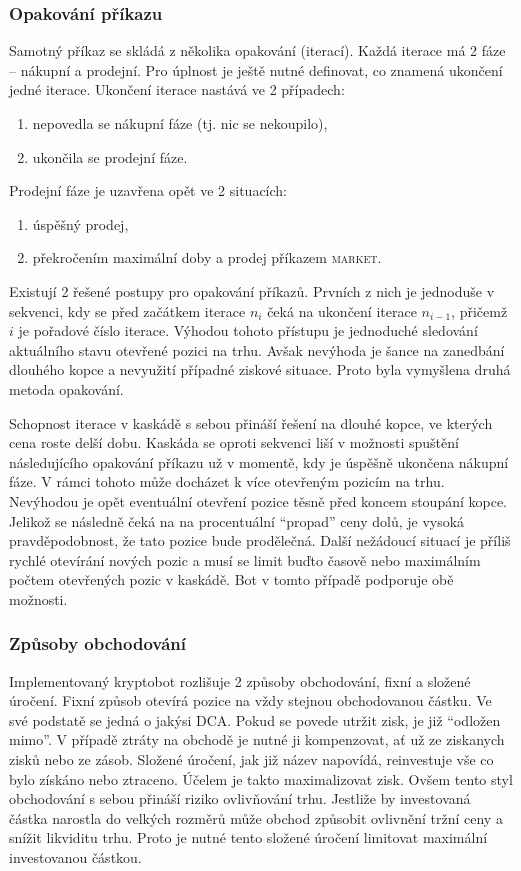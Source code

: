 \subsubsection{Opakování příkazu}
Samotný příkaz se skládá z několika opakování (iterací). Každá iterace má 2 fáze -- nákupní a prodejní. Pro úplnost je ještě nutné definovat, co znamená ukončení jedné iterace.
Ukončení iterace nastává ve 2 případech:
\begin{enumerate}
    \item nepovedla se nákupní fáze (tj. nic se nekoupilo),
    \item ukončila se prodejní fáze.
\end{enumerate}
Prodejní fáze je uzavřena opět ve 2 situacích:
\begin{enumerate}
    \item úspěšný prodej,
    \item překročením maximální doby a prodej příkazem \textsc{market}.
\end{enumerate}

Existují 2 řešené postupy pro opakování příkazů. Prvních z nich je jednoduše v sekvenci, kdy se před začátkem iterace $n_i$ čeká na ukončení iterace $n_{i - 1}$, přičemž $i$ je pořadové
číslo iterace. Výhodou tohoto přístupu je jednoduché sledování aktuálního stavu otevřené pozici na trhu. Avšak nevýhoda je šance na zanedbání dlouhého kopce a nevyužití případné ziskové situace.
Proto byla vymyšlena druhá metoda opakování.

Schopnost iterace v kaskádě s sebou přináší řešení na dlouhé kopce, ve kterých cena roste delší dobu. Kaskáda se oproti sekvenci liší v možnosti spuštění následujícího opakování příkazu
už v momentě, kdy je úspěšně ukončena nákupní fáze. V rámci tohoto může docházet k více otevřeným pozicím na trhu. Nevýhodou je opět eventuální otevření pozice těsně před koncem stoupání
kopce. Jelikož se následně čeká na na procentuální \enquote{propad} ceny dolů, je vysoká pravděpodobnost, že tato pozice bude prodělečná. Další nežádoucí situací je příliš rychlé otevírání
nových pozic a musí se limit buďto časově nebo maximálním počtem otevřených pozic v kaskádě. Bot v tomto případě podporuje obě možnosti.

\subsubsection{Způsoby obchodování}
Implementovaný kryptobot rozlišuje 2 způsoby obchodování, fixní a složené úročení. Fixní způsob otevírá pozice na vždy stejnou obchodovanou částku. Ve své podstatě se jedná o jakýsi DCA. Pokud se
povede utržit zisk, je již \enquote{odložen mimo}. V případě ztráty na obchodě je nutné ji kompenzovat, ať už ze ziskanych zisků nebo ze zásob.
Složené úročení, jak již název napovídá, reinvestuje vše co bylo získáno nebo ztraceno. Účelem je takto maximalizovat zisk. Ovšem tento styl obchodování s sebou přináší riziko ovlivňování trhu. Jestliže
by investovaná částka narostla do velkých rozměrů může obchod způsobit ovlivnění tržní ceny a snížit likviditu trhu. Proto je nutné tento složené úročení limitovat maximální investovanou částkou.


